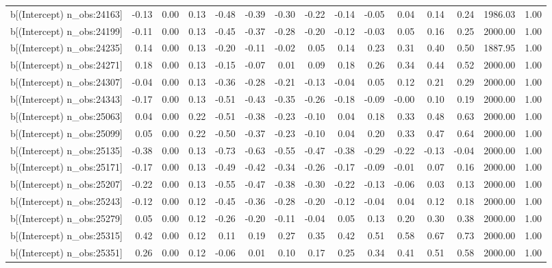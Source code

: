 \begin{table}[ht]
\begin{tabular}{rrrrrrrrrrrrrrr}
  b[(Intercept) n\_obs:24163] & -0.13 & 0.00 & 0.13 & -0.48 & -0.39 & -0.30 & -0.22 & -0.14 & -0.05 & 0.04 & 0.14 & 0.24 & 1986.03 & 1.00 \\ 
  b[(Intercept) n\_obs:24199] & -0.11 & 0.00 & 0.13 & -0.45 & -0.37 & -0.28 & -0.20 & -0.12 & -0.03 & 0.05 & 0.16 & 0.25 & 2000.00 & 1.00 \\ 
  b[(Intercept) n\_obs:24235] & 0.14 & 0.00 & 0.13 & -0.20 & -0.11 & -0.02 & 0.05 & 0.14 & 0.23 & 0.31 & 0.40 & 0.50 & 1887.95 & 1.00 \\ 
  b[(Intercept) n\_obs:24271] & 0.18 & 0.00 & 0.13 & -0.15 & -0.07 & 0.01 & 0.09 & 0.18 & 0.26 & 0.34 & 0.44 & 0.52 & 2000.00 & 1.00 \\ 
  b[(Intercept) n\_obs:24307] & -0.04 & 0.00 & 0.13 & -0.36 & -0.28 & -0.21 & -0.13 & -0.04 & 0.05 & 0.12 & 0.21 & 0.29 & 2000.00 & 1.00 \\ 
  b[(Intercept) n\_obs:24343] & -0.17 & 0.00 & 0.13 & -0.51 & -0.43 & -0.35 & -0.26 & -0.18 & -0.09 & -0.00 & 0.10 & 0.19 & 2000.00 & 1.00 \\ 
  b[(Intercept) n\_obs:25063] & 0.04 & 0.00 & 0.22 & -0.51 & -0.38 & -0.23 & -0.10 & 0.04 & 0.18 & 0.33 & 0.48 & 0.63 & 2000.00 & 1.00 \\ 
  b[(Intercept) n\_obs:25099] & 0.05 & 0.00 & 0.22 & -0.50 & -0.37 & -0.23 & -0.10 & 0.04 & 0.20 & 0.33 & 0.47 & 0.64 & 2000.00 & 1.00 \\ 
  b[(Intercept) n\_obs:25135] & -0.38 & 0.00 & 0.13 & -0.73 & -0.63 & -0.55 & -0.47 & -0.38 & -0.29 & -0.22 & -0.13 & -0.04 & 2000.00 & 1.00 \\ 
  b[(Intercept) n\_obs:25171] & -0.17 & 0.00 & 0.13 & -0.49 & -0.42 & -0.34 & -0.26 & -0.17 & -0.09 & -0.01 & 0.07 & 0.16 & 2000.00 & 1.00 \\ 
  b[(Intercept) n\_obs:25207] & -0.22 & 0.00 & 0.13 & -0.55 & -0.47 & -0.38 & -0.30 & -0.22 & -0.13 & -0.06 & 0.03 & 0.13 & 2000.00 & 1.00 \\ 
  b[(Intercept) n\_obs:25243] & -0.12 & 0.00 & 0.12 & -0.45 & -0.36 & -0.28 & -0.20 & -0.12 & -0.04 & 0.04 & 0.12 & 0.18 & 2000.00 & 1.00 \\ 
  b[(Intercept) n\_obs:25279] & 0.05 & 0.00 & 0.12 & -0.26 & -0.20 & -0.11 & -0.04 & 0.05 & 0.13 & 0.20 & 0.30 & 0.38 & 2000.00 & 1.00 \\ 
  b[(Intercept) n\_obs:25315] & 0.42 & 0.00 & 0.12 & 0.11 & 0.19 & 0.27 & 0.35 & 0.42 & 0.51 & 0.58 & 0.67 & 0.73 & 2000.00 & 1.00 \\ 
  b[(Intercept) n\_obs:25351] & 0.26 & 0.00 & 0.12 & -0.06 & 0.01 & 0.10 & 0.17 & 0.25 & 0.34 & 0.41 & 0.51 & 0.58 & 2000.00 & 1.00 \\ 

\end{tabular}
\end{table}
